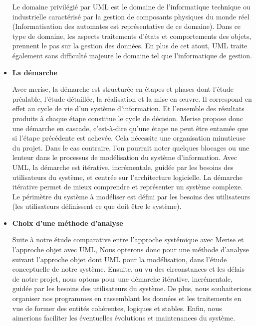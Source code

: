\begin{itemize}
	      Le domaine privilégié par UML est le domaine de l’informatique technique ou industrielle caractérisé par la gestion de composants physiques du monde réel (Informatisation des automates est représentative de ce domaine). 
		  Dans ce type de domaine, les aspects traitements d’états et comportements des objets, prennent le pas sur la gestion des données. 
		  En plus de cet atout, UML traite également sans difficulté majeure le domaine tel que l’informatique de gestion.

	\item \textbf{La démarche}

	      Avec merise, la démarche est structurée en étapes et phases dont l’étude préalable, l’étude
	      détaillée, la réalisation et la mise en œuvre. Il correspond en effet au cycle de vie d’un système
	      d’information. Et l’ensemble des résultats produits à chaque étape constitue le cycle de décision.
	      Merise propose donc une démarche en cascade, c’est-à-dire qu’une étape ne peut être entamée
	      que si l’étape précédente est achevée. Cela nécessite une organisation minutieuse du projet.
	      Dans le cas contraire, l’on pourrait noter quelques blocages ou une lenteur dans le processus
	      de modélisation du système d’information. Avec UML, la démarche est itérative, incrémentale,
	      guidée par les besoins des utilisateurs du système, et centrée sur l’architecture logicielle. La
	      démarche itérative permet de mieux comprendre et représenter un système complexe. Le
	      périmètre du système à modéliser est défini par les besoins des utilisateurs (les utilisateurs
	      définissent ce que doit être le système).

	\item \textbf{Choix d’une méthode d’analyse}

	      Suite à notre étude comparative entre l’approche systémique avec Merise et l’approche objet avec UML, Nous opterons donc pour une méthode d’analyse suivant l’approche objet dont UML pour la modélisation, dans l’étude conceptuelle de notre système.
	      Ensuite, au vu des circonstances et les délais de notre projet, nous optons pour une démarche itérative, incrémentale, guidée par
	      les besoins des utilisateurs du système. De plus, nous souhaiterions organiser nos programmes
	      en rassemblant les données et les traitements en vue de former des entités cohérentes, logiques
	      et stables. Enfin, nous aimerions faciliter les éventuelles évolutions et maintenances du système.
\end{itemize}

